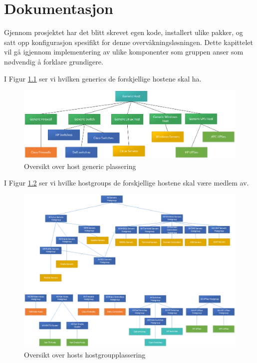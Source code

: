 \chapter{Dokumentasjon}
Gjennom prosjektet har det blitt skrevet egen kode, installert ulike pakker, og satt opp konfigurasjon spesifikt for denne overvåkningsløsningen. Dette kapittelet vil gå igjennom implementering av ulike komponenter som gruppen anser som nødvendig å forklare grundigere.

I Figur \ref{hostfigur} ser vi hvilken generics de forskjellige hostene skal ha.

\begin{figure}[H]
    \centering
    \includegraphics[scale=0.5]{img/host}
    \caption{Oversikt over host generic plassering}
    \label{hostfigur}
\end{figure}

I Figur \ref{hostgroupfigur} ser vi hvilke hostgroups de forskjellige hostene skal være medlem av.

\begin{figure}[H]
    \centering
    \includegraphics[scale=0.5]{img/hostgroups}
    \caption{Oversikt over hosts hostgroupplassering}
    \label{hostgroupfigur}
\end{figure}


